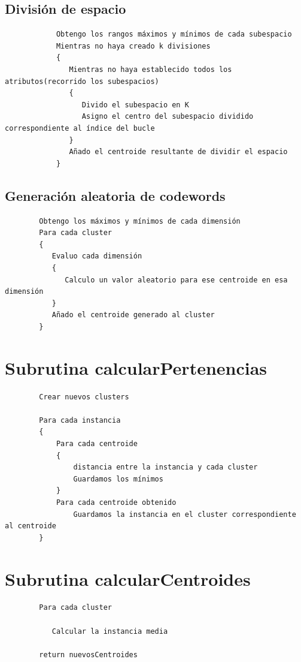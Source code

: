 \documentclass[a4paper]{report}
\begin{document}
		\subsection{División de espacio}
			\begin{verbatim}
			Obtengo los rangos máximos y mínimos de cada subespacio
			Mientras no haya creado k divisiones
			{
			   Mientras no haya establecido todos los atributos(recorrido los subespacios)
			   {
			      Divido el subespacio en K
			      Asigno el centro del subespacio dividido correspondiente al índice del bucle
			   }
			   Añado el centroide resultante de dividir el espacio
			}
			\end{verbatim}
		
		\subsection{Generación aleatoria de codewords}
		\begin{verbatim}
		Obtengo los máximos y mínimos de cada dimensión
		Para cada cluster
		{
		   Evaluo cada dimensión
		   {
		      Calculo un valor aleatorio para ese centroide en esa dimensión
		   }
		   Añado el centroide generado al cluster
		}
		\end{verbatim}
	\section{Subrutina calcularPertenencias}
	
		\begin{verbatim}
		Crear nuevos clusters 
		
		Para cada instancia
		{
		    Para cada centroide
		    {
		        distancia entre la instancia y cada cluster
		        Guardamos los mínimos 
		    }    
		    Para cada centroide obtenido
		        Guardamos la instancia en el cluster correspondiente al centroide
		}
		\end{verbatim}
	
	\section{Subrutina calcularCentroides}
	
		\begin{verbatim}
		Para cada cluster
		
		   Calcular la instancia media
		   
		return nuevosCentroides
		\end{verbatim}
	
\end{document}
